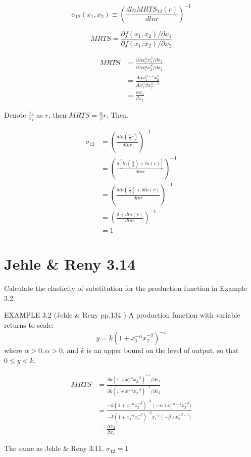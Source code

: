 \documentclass{article}
\begin{document}
\begin{mdframed}[backgroundcolor=blue!20,linecolor=white]
$$\sigma_{12}(x_1,x_2) \equiv (\frac{d ln MRTS_{12}(r)}{dln r})^{-1}$$

$$ MRTS = \frac{\partial f(x_1,x_2) / \partial x_1}{\partial f(x_1,x_2) / \partial x_2}$$

\end{mdframed}

\begin{align*}
MRTS &= \frac{\partial  Ax_1^\alpha x_2^\beta / \partial x_1}{\partial  Ax_1^\alpha x_2^\beta / \partial x_2} \\
 &= \frac{A\alpha x_1^{\alpha - 1} x_2^\beta }{Ax_1^\alpha \beta x_2^{\beta -1}} \\
 &= \frac{\alpha x_2}{\beta x_1}
\end{align*}


Denote $\frac{x_2}{ x_1}$ as $r$, then $MRTS =  \frac{\alpha}{\beta} r$. Then,

\begin{align*}
\sigma_{12}&= (\frac{d ln (\frac{\alpha}{\beta} r)}{dln r})^{-1} \\
&= (\frac{d [ln (\frac{\alpha}{\beta}) +ln(r)]}{dln r})^{-1} \\
&= (\frac{d ln (\frac{\alpha}{\beta}) +d ln(r)}{d ln r})^{-1} \\
&= (\frac{0 +d ln(r)}{d ln r})^{-1} \\
& = 1
\end{align*}


\section{Jehle \& Reny 3.14}

Calculate the elasticity of substitution for the production function in Example 3.2.

\begin{mdframed}[backgroundcolor=blue!20,linecolor=white]
EXAMPLE 3.2 (Jehle \& Reny  pp.134 ) A production function with variable returns to scale:
$$y = k(1 + x_1^{-\alpha} x_2^{-\beta} )^{-1}$$
where $\alpha > 0,\alpha > 0$, and $k$ is an upper bound on the level of output, so that $0 \le y < k$.
\end{mdframed}

\begin{align*}
MRTS &= \frac{\partial k(1 + x_1^{-\alpha} x_2^{-\beta} )^{-1} / \partial x_1}{\partial k(1 + x_1^{-\alpha} x_2^{-\beta} )^{-1} / \partial x_2} \\
 &= \frac{-k(1 + x_1^{-\alpha} x_2^{-\beta} )^{-2}(-\alpha) x_1^{-\alpha-1} x_2^{-\beta})}{-k(1 + x_1^{-\alpha} x_2^{-\beta} )^{-2} x_1^{-\alpha} (-\beta)x_2^{-\beta-1})} \\
 &= \frac{\alpha x_2}{\beta x_1}
\end{align*}

The same as Jehle \& Reny 3.11, $\sigma_{12} = 1$
\end{document}
